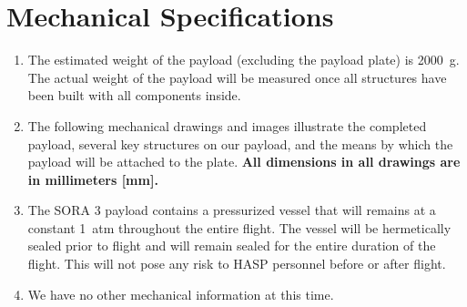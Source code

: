 \newpage
\section{Mechanical Specifications}
\label{sec:Mechanical}

\hspace*{0.5cm}
\begin{minipage}{\linewidth-0.5cm}
  \begin{enumerate}[label=\Alph*.]
  \item The estimated weight of the payload (excluding the payload plate) is \SI{2000}{\gram}. The actual weight of the payload will be measured once all structures have been built with all components inside.
  \item The following mechanical drawings and images illustrate the completed payload, several key structures on our payload, and the means by which the payload will be attached to the plate. \textbf{All dimensions in all drawings are in millimeters [\si{\milli\meter}].}
  \item The SORA 3 payload contains a pressurized vessel that will remains at a constant \SI{1}{atm} throughout the entire flight. The vessel will be hermetically sealed prior to flight and will remain sealed for the entire duration of the flight. This will not pose any risk to HASP personnel before or after flight.
  \item We have no other mechanical information at this time.
  \end{enumerate}
\end{minipage}

\hspace{1cm}

